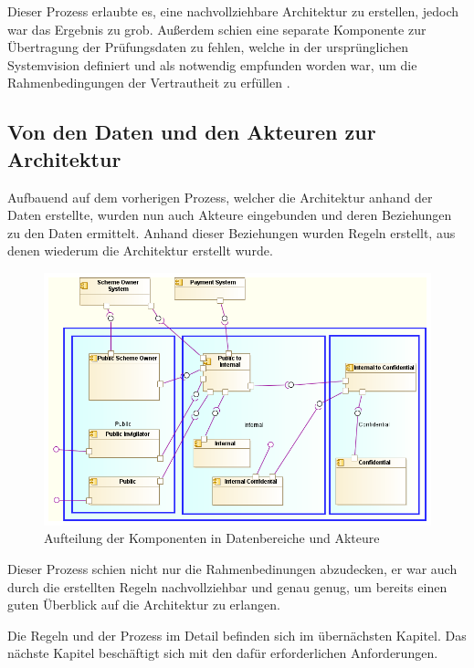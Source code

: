 Dieser Prozess erlaubte es, eine nachvollziehbare Architektur zu erstellen, jedoch war das Ergebnis zu grob. Außerdem schien eine separate Komponente zur  Übertragung der Prüfungsdaten zu fehlen, welche in der ursprünglichen Systemvision definiert und als notwendig empfunden worden war, um die Rahmenbedingungen der Vertrautheit zu erfüllen \cite[7.3]{ISO_CERT}.

\subsection{Von den Daten und den Akteuren zur Architektur}
Aufbauend auf dem vorherigen Prozess, welcher die Architektur anhand der Daten erstellte, wurden nun auch Akteure eingebunden und deren Beziehungen zu den Daten ermittelt. Anhand dieser Beziehungen wurden Regeln erstellt, aus denen wiederum die Architektur erstellt wurde.

\begin{figure}[!htbp]
    \centering
    \includegraphics[scale=0.55]{uml/vision4.png}
    \caption{Aufteilung der Komponenten in Datenbereiche und Akteure}
\end{figure}

Dieser Prozess schien nicht nur die Rahmenbedinungen abzudecken, er war auch durch die erstellten Regeln nachvollziehbar und genau genug, um bereits einen guten Überblick auf die Architektur zu erlangen.

Die Regeln und der Prozess im Detail befinden sich im übernächsten Kapitel. Das nächste Kapitel beschäftigt sich mit den dafür erforderlichen Anforderungen.